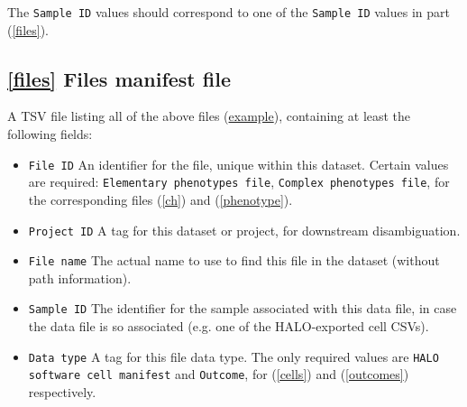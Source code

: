 \documentclass[14pt]{article}
\begin{document}
The \colorbox{yellow!25}{\texttt{Sample ID}} values should correspond to one of the \colorbox{yellow!25}{\texttt{Sample ID}} values in part (\ref{files}).

\subsection*{\ref{files} Files manifest file} A TSV file listing all of the above files (\href{https://github.com/nadeemlab/SPT/blob/main/tests/data/file_manifest.tsv}{example}), containing at least the following fields:

\begin{itemize}
  \itemsep0em
  \item[]{\colorbox{yellow!25}{\texttt{File ID}} \hspace{0.5pc} An identifier for the file, unique within this dataset. Certain values are required: \colorbox{gray!20}{\texttt{Elementary phenotypes file}}, \colorbox{gray!20}{\texttt{Complex phenotypes file}}, for the corresponding files (\ref{ch}) and (\ref{phenotype}).}
  \item[]{\colorbox{yellow!25}{\texttt{Project ID}} \hspace{0.5pc} A tag for this dataset or project, for downstream disambiguation.}
  \item[]{\colorbox{yellow!25}{\texttt{File name}} \hspace{0.5pc} The actual name to use to find this file in the dataset (without path information).}
  \item[]{\colorbox{yellow!25}{\texttt{Sample ID}} \hspace{0.5pc} The identifier for the sample associated with this data file, in case the data file is so associated (e.g. one of the HALO-exported cell CSVs).}
  \item[]{\colorbox{yellow!25}{\texttt{Data type}} \hspace{0.5pc} A tag for this file data type. The only required values are \colorbox{gray!20}{\texttt{HALO software cell manifest}} and \colorbox{gray!20}{\texttt{Outcome}}, for (\ref{cells}) and (\ref{outcomes}) respectively.}
\end{itemize}
\end{document}
